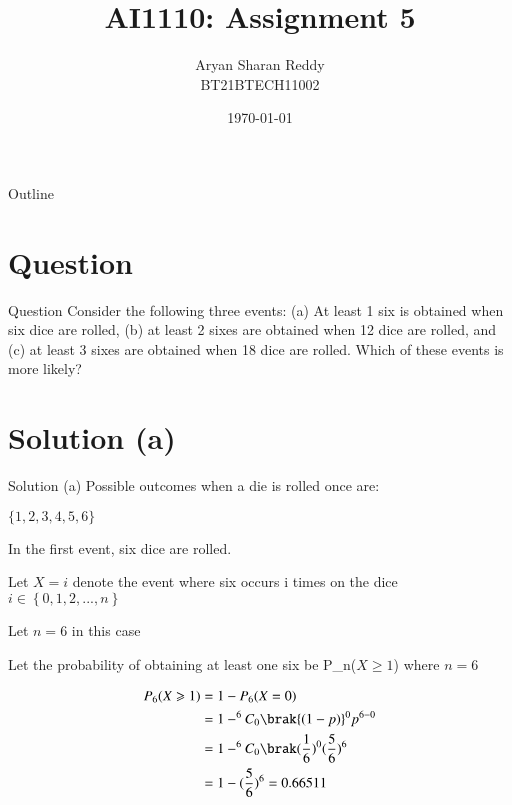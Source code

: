 \documentclass{beamer}
\title{AI1110: Assignment 5}
\author{Aryan Sharan Reddy\\BT21BTECH11002}
\date{\today}
\providecommand{\cbrak}[1]{\ensuremath{\left\{#1\right\}}}
\begin{document}
\begin{frame}
    \titlepage 
\end{frame}



\begin{frame}{Outline}
    \tableofcontents
\end{frame}


\section{Question}
\begin{frame}{Question}
  Consider the following three events: (a) At least 1 six is obtained when six dice are rolled, (b) at least 2 sixes are obtained when 12 dice are rolled, and (c) at least 3 sixes are obtained when 18 dice are rolled. Which of these events is more likely?  
\end{frame}

\section{Solution (a)}
\begin{frame}{Solution (a)}
   Possible outcomes when a die is rolled once are:
   \begin{center}
      $ \{1, 2, 3, 4, 5, 6\}$
   \end{center}
   In the first event, six dice are rolled.
   
   Let $X=i$ denote the event where six occurs i times on the dice $i\in \cbrak{0,1, 2,..., n}$ 
   
    Let $n = 6$ in this case
   
   Let the probability of obtaining at least one six be P_{n}($X \geqslant 1$) where $n = 6$
   
  \begin{align}
    P_{6}(X \geqslant 1)&= 1-P_{6}(X = 0)\\
    &= 1- ^6C_0 \brak{(1-p)}^{0}p^{6-0}\\
    &= 1- ^6C_0\brak(\dfrac{1}{6})^{0}(\dfrac{5}{6})^{6}\\
    &=1- (\dfrac{5}{6})^{6} = 0.66511
   \end{align}
   
\end{frame}
\end{document}
